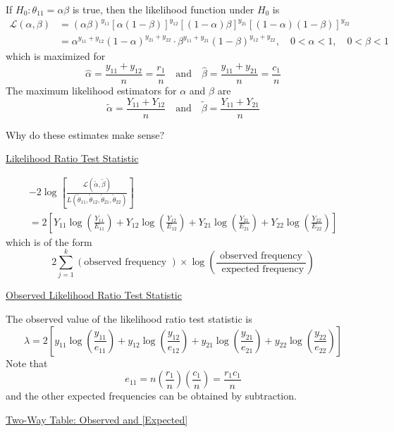 If $H_{0}: \theta_{11}=\alpha \beta$ is true, then the likelihood function under $H_{0}$ is
\[
    \begin{aligned}
        \mathcal{L}(\alpha, \beta) & =(\alpha \beta)^{y_{11}}[\alpha(1-\beta)]^{y_{12}}[(1-\alpha) \beta]^{y_{21}}[(1-\alpha)(1-\beta)]^{y_{22}}                               \\
                         & =\alpha^{y_{11}+y_{12}}(1-\alpha)^{y_{21}+y_{22}} \cdot \beta^{y_{11}+y_{21}}(1-\beta)^{y_{12}+y_{22}}, \quad 0<\alpha<1, \quad 0<\beta<1
    \end{aligned}
\]
which is maximized for
\[
    \hat{\alpha}=\frac{y_{11}+y_{12}}{n}=\frac{r_{1}}{n} \quad \text{and} \quad \hat{\beta}=\frac{y_{11}+y_{21}}{n}=\frac{c_{1}}{n}
\]
The maximum likelihood estimators for $\alpha$ and $\beta$ are
\[
    \tilde{\alpha}=\frac{Y_{11}+Y_{12}}{n} \quad \text{and} \quad \tilde{\beta}=\frac{Y_{11}+Y_{21}}{n}
\]

Why do these estimates make sense?

\underline{Likelihood Ratio Test Statistic}

\[
    \begin{array}{c}
        -2 \log \left[\frac{\mathcal{L}(\tilde{\alpha}, \tilde{\beta})}{L\left(\tilde{\theta}_{11}, \tilde{\theta}_{12}, \tilde{\theta}_{21}, \tilde{\theta}_{22}\right)}\right] \\
        =2\left[Y_{11} \log \left(\frac{Y_{11}}{E_{11}}\right)+Y_{12} \log \left(\frac{Y_{12}}{E_{12}}\right)+Y_{21} \log \left(\frac{Y_{21}}{E_{21}}\right)+Y_{22} \log \left(\frac{Y_{22}}{E_{22}}\right)\right]
    \end{array}
\]
which is of the form
\[
    2 \sum_{j=1}^{k}(\text{observed frequency }) \times \log \left(\frac{\text{ observed frequency }}{\text{ expected frequency}}\right)
\]

\underline{Observed Likelihood Ratio Test Statistic}

The observed value of the likelihood ratio test statistic is
\[
    \lambda=2\left[y_{11} \log \left(\frac{y_{11}}{e_{11}}\right)+y_{12} \log \left(\frac{y_{12}}{e_{12}}\right)+y_{21} \log \left(\frac{y_{21}}{e_{21}}\right)+y_{22} \log \left(\frac{y_{22}}{e_{22}}\right)\right]
\]
Note that
\[
    e_{11}=n\left(\frac{r_{1}}{n}\right)\left(\frac{c_{1}}{n}\right)=\frac{r_{1} c_{1}}{n}
\]
and the other expected frequencies can be obtained by subtraction.

\underline{Two-Way Table: Observed and [Expected]}

